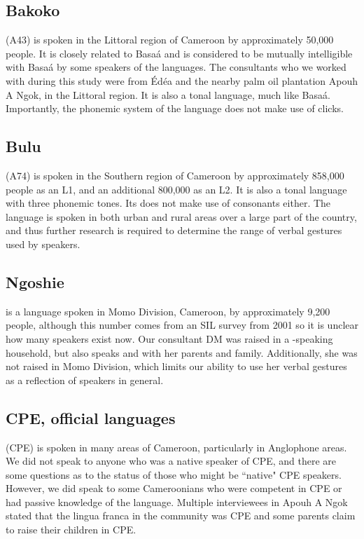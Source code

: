 \documentclass[output=paper
,newtxmath
,modfonts
,nonflat]{langsci/langscibook}
\begin{document}
\subsection{Bakoko}

 (A43) is spoken in the Littoral region of Cameroon by approximately 50,000 people. It is closely related to Basa\'a and is considered to be mutually intelligible with Basa\'a by some speakers of the languages. The  consultants who we worked with during this study were from \'Ed\'ea and the nearby palm oil plantation Apouh A Ngok, in the Littoral region. It is also a tonal language, much like Basa\'a. Importantly, the phonemic system of the language does not make use of clicks. 

\subsection{Bulu}

 (A74) is spoken in the Southern region of Cameroon by approximately 858,000 people as an L1, and an additional 800,000 as an L2. It is also a tonal language with three phonemic tones. Its  does not make use of  consonants either. The language is spoken in both urban and rural areas over a large part of the country, and thus further research is required to determine the range of verbal gestures used by  speakers. 

\subsection{Ngoshie}
 is a   language spoken in Momo Division, Cameroon, by approximately 9,200 people, although this number comes from an SIL survey from 2001 \citep{lewisetal2016} so it is unclear how many speakers exist now. Our consultant DM was raised in a -speaking household, but also speaks  and  with her parents and family. Additionally, she was not raised in Momo Division, which limits our ability to use her verbal gestures as a reflection of  speakers in general. %

\subsection{CPE, official languages}

 (CPE) is spoken in many areas of Cameroon, particularly in Anglophone areas. We did not speak to anyone who was a native speaker of CPE, and there are some questions as to the status of those who might be ``native" CPE speakers. However, we did speak to some Cameroonians who were competent in CPE or had passive knowledge of the language. Multiple interviewees in Apouh A Ngok stated that the lingua franca in the community was CPE and some parents claim to raise their children in CPE. 
\end{document}

